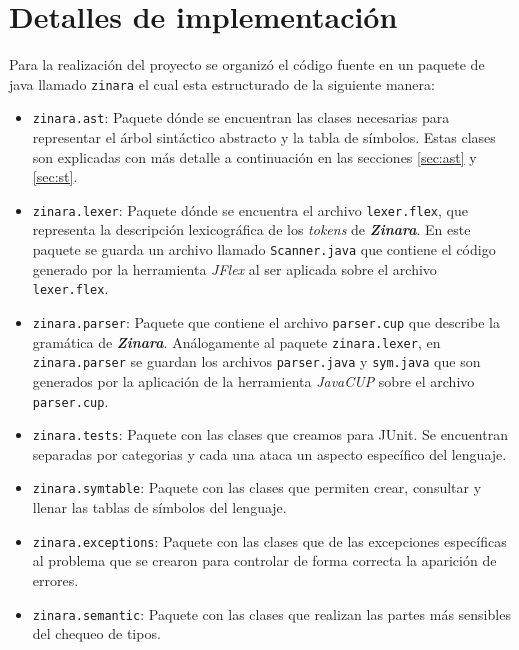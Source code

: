 \documentclass[12pt, spanish]{report}
\begin{document}
\chapter{Detalles de implementaci\'on}
\label{sec:codigo}

Para la realizaci\'on del proyecto se organiz\'o el c\'odigo fuente en
un paquete de java llamado \texttt{zinara} el cual esta estructurado
de la siguiente manera:

\begin{itemize}
\item \texttt{zinara.ast}: Paquete d\'onde se encuentran las clases
  necesarias para representar el \'arbol sint\'actico abstracto y la
  tabla de s\'imbolos. Estas clases son explicadas con m\'as detalle a
  continuaci\'on en las secciones \ref{sec:ast} y \ref{sec:st}.

\item \texttt{zinara.lexer}: Paquete d\'onde se encuentra el archivo
  \texttt{lexer.flex}, que representa la descripci\'on lexicogr\'afica
  de los \emph{tokens} de \emph{\textbf{Zinara}}. En este paquete se
  guarda un archivo llamado \texttt{Scanner.java} que contiene el
  c\'odigo generado por la herramienta \emph{JFlex} al ser aplicada
  sobre el archivo \texttt{lexer.flex}.

\item \texttt{zinara.parser}: Paquete que contiene el archivo
  \texttt{parser.cup} que describe la gram\'atica de
  \emph{\textbf{Zinara}}. An\'alogamente al paquete
  \texttt{zinara.lexer}, en \texttt{zinara.parser} se guardan los
  archivos \texttt{parser.java} y \texttt{sym.java} que son generados
  por la aplicaci\'on de la herramienta \emph{JavaCUP} sobre el
  archivo \texttt{parser.cup}.

\item \texttt{zinara.tests}: Paquete con las clases que creamos para
  JUnit. Se encuentran separadas por categorias y cada una ataca un
  aspecto espec\'ifico del lenguaje.

\item \texttt{zinara.symtable}: Paquete con las clases que permiten
  crear, consultar y llenar las tablas de s\'imbolos del lenguaje.

\item \texttt{zinara.exceptions}: Paquete con las clases que de las
  excepciones espec\'ificas al problema que se crearon para controlar
  de forma correcta la aparici\'on de errores.

\item \texttt{zinara.semantic}: Paquete con las clases que realizan
  las partes m\'as sensibles del chequeo de tipos.


\end{itemize}
\end{document}
